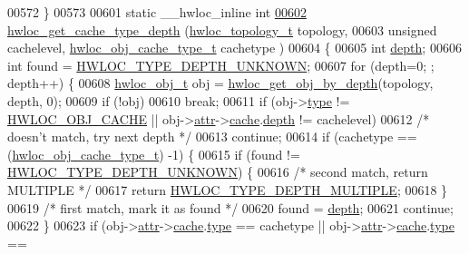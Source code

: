 \begin{DoxyCode}
00572 \}
00573 
00601 \textcolor{keyword}{static} \_\_hwloc\_inline \textcolor{keywordtype}{int}
\hypertarget{a00031_source_l00602}{}\hyperlink{a00057_gac3cfbb68829b606e61ab039f142f29a0}{00602} \hyperlink{a00057_gac3cfbb68829b606e61ab039f142f29a0}{hwloc_get_cache_type_depth} (\hyperlink{a00039_ga9d1e76ee15a7dee158b786c30b6a6e38}{hwloc_topology_t} topology,
00603                             \textcolor{keywordtype}{unsigned} cachelevel, \hyperlink{a00041_gab6e1e7efedae8b341f3ee14fbe53d66c}{hwloc_obj_cache_type_t} cachetype
      )
00604 \{
00605   \textcolor{keywordtype}{int} \hyperlink{a00016_a9d82690370275d42d652eccdea5d3ee5}{depth};
00606   \textcolor{keywordtype}{int} found = \hyperlink{a00046_ggaf4e663cf42bbe20756b849c6293ef575a0565ab92ab72cb0cec91e23003294aad}{HWLOC_TYPE_DEPTH_UNKNOWN};
00607   \textcolor{keywordflow}{for} (depth=0; ; depth++) \{
00608     \hyperlink{a00016}{hwloc_obj_t} obj = \hyperlink{a00047_gaedd78240b0c1108355586a268ec5a697}{hwloc_get_obj_by_depth}(topology, depth, 0);
00609     \textcolor{keywordflow}{if} (!obj)
00610       \textcolor{keywordflow}{break};
00611     \textcolor{keywordflow}{if} (obj->\hyperlink{a00016_acc4f0803f244867e68fe0036800be5de}{type} != \hyperlink{a00041_ggacd37bb612667dc437d66bfb175a8dc55a56ee0b7eca88f363b75b34fdde8c9ddc}{HWLOC_OBJ_CACHE} || obj->\hyperlink{a00016_accd40e29f71f19e88db62ea3df02adc8}{attr}->\hyperlink{a00017_ab5a8ae3bf490e6b1071fea53f7382836}{cache}.\hyperlink{a00013_a5c8f7f39193736c2187ed626940835d5}{depth} != cachelevel)
00612       \textcolor{comment}{/* doesn't match, try next depth */}
00613       \textcolor{keywordflow}{continue};
00614     \textcolor{keywordflow}{if} (cachetype == (\hyperlink{a00041_gab6e1e7efedae8b341f3ee14fbe53d66c}{hwloc_obj_cache_type_t}) -1) \{
00615       \textcolor{keywordflow}{if} (found != \hyperlink{a00046_ggaf4e663cf42bbe20756b849c6293ef575a0565ab92ab72cb0cec91e23003294aad}{HWLOC_TYPE_DEPTH_UNKNOWN}) \{
00616         \textcolor{comment}{/* second match, return MULTIPLE */}
00617         \textcolor{keywordflow}{return} \hyperlink{a00046_ggaf4e663cf42bbe20756b849c6293ef575ae99465995cacde6c210d5fc2e409798c}{HWLOC_TYPE_DEPTH_MULTIPLE};
00618       \}
00619       \textcolor{comment}{/* first match, mark it as found */}
00620       found = \hyperlink{a00016_a9d82690370275d42d652eccdea5d3ee5}{depth};
00621       \textcolor{keywordflow}{continue};
00622     \}
00623     \textcolor{keywordflow}{if} (obj->\hyperlink{a00016_accd40e29f71f19e88db62ea3df02adc8}{attr}->\hyperlink{a00017_ab5a8ae3bf490e6b1071fea53f7382836}{cache}.\hyperlink{a00013_ad8edc8ded2b7a70d6abbc874801930f4}{type} == cachetype || obj->\hyperlink{a00016_accd40e29f71f19e88db62ea3df02adc8}{attr}->\hyperlink{a00017_ab5a8ae3bf490e6b1071fea53f7382836}{cache}.\hyperlink{a00013_ad8edc8ded2b7a70d6abbc874801930f4}{type} == 

\end{DoxyCode}
